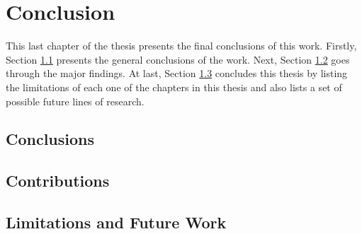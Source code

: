 \chapter{Conclusion}
\label{cha:conclusion}

\begin{chapterabstract}
This last chapter of the thesis presents the final conclusions of this work. Firstly, Section \ref{cha:conclusion:sec:findings} presents the general conclusions of the work. Next, Section \ref{cha:conclusion:sec:contributions} goes through the major findings. At last, Section \ref{cha:conclusion:sec:future} concludes this thesis by listing the limitations of each one of the chapters in this thesis and also lists a set of possible future lines of research.
\end{chapterabstract}

\minitoc

\clearpage

\section{Conclusions}
\label{cha:conclusion:sec:findings}



\section{Contributions}
\label{cha:conclusion:sec:contributions}


\section{Limitations and Future Work}
\label{cha:conclusion:sec:future}
